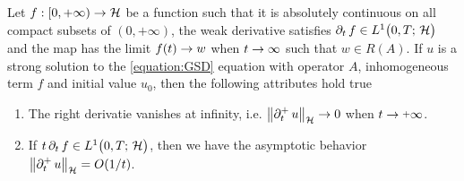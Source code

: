 \begin{theorem}\label{theorem:right der goes to zero}
	Let $ f:[0,+\infty)\rightarrow\mathcal{H} $ be a function such that
	it is absolutely continuous on all compact subsets
	of $ (0,+\infty) $, the weak derivative satisfies $ \partial_t\, f\in L^{1}\big(0,T;\,\mathcal{H}\big) $ 
	and the map has the limit $f(t)\rightarrow w$ when $ t\rightarrow\infty$ such that $ w\in R(A) $.
	If $ u $ is a strong solution to the \ref{equation:GSD} equation
	with operator $ A $, inhomogeneous term $ f $ and initial
	value $ u_0 $, then the following attributes hold true
	\begin{enumerate}[label=(\roman*)]
		\item The right derivatie vanishes at infinity, i.e. 
		$ \left\Vert \partial_t^+\, u\right\Vert_{\mathcal{H}}\rightarrow 0 $ when $ t\ra\plus\infty $.
		\item If $ t\, \partial_t\, f\in L^{1}\big(0,T;\,\mathcal{H}\big) $, then we have
		the asymptotic behavior $\left\Vert \partial_t^+\, u\right\Vert_{\mathcal{H}}=O(1/t) $.
	\end{enumerate}
\end{theorem}
